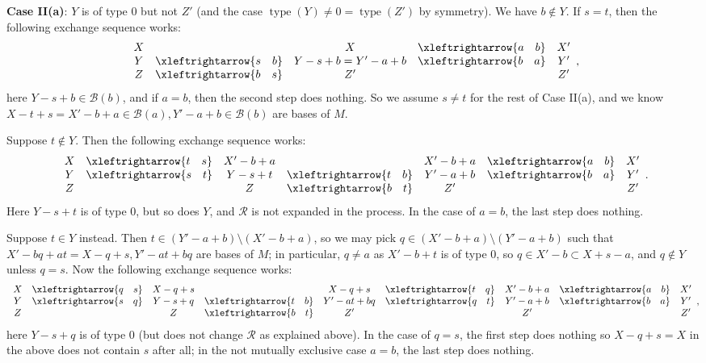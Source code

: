 \documentclass{amsart}
\newcommand{\swap}[2]{\xleftrightarrow{#1 \quad #2}}
\newcommand\Bcal{{\mathcal B}}
\newcommand\Rcal{{\mathcal R}}
\DeclareMathOperator{\type}{type}
\begin{document}
{\bf Case II(a)}: $Y$ is of type 0 but not $Z'$ (and the case $\type(Y)\neq 0=\type(Z')$ by symmetry). We have $b\not\in Y$. If $s=t$, then the following exchange sequence works:
$$
    \begin{array}{c c c c c c c}
        X   &             & X 
            & \swap{a}{b} & X' \\
        Y & \swap{s}{b} & Y-s+b = Y' - a + b
            & \swap{b}{a} & Y' \\
        Z   & \swap{b}{s} & Z'  
            &             & Z'
    \end{array},
$$
here $Y-s+b\in\Bcal(b)$, and if $a=b$, then the second step does nothing. So we assume $s\neq t$ for the rest of Case II(a), and we know $X-t+s=X'-b+a\in\Bcal(a), Y'-a+b\in\Bcal(b)$ are bases of $M$.

Suppose $t\not\in Y$. Then the following exchange sequence works:
$$
    \begin{array}{c c c c c c c}
        X   & \swap{t}{s} & X' - b + a 
            &             & X' - b + a 
            & \swap{a}{b} & X' \\
        Y & \swap{s}{t} & Y - s + t 
            & \swap{t}{b} & Y' - a + b 
            & \swap{b}{a} & Y' \\
        Z   &             & Z 
            & \swap{b}{t} &  Z'  
            &             & Z'
    \end{array}.
$$
Here $Y-s+t$ is of type 0, but so does $Y$, and $\Rcal$ is not expanded in the process. In the case of $a=b$, the last step does nothing.

Suppose $t\in Y$ instead. Then $t\in (Y'-a+b)\setminus (X'-b+a)$, so we may pick $q\in (X'-b+a)\setminus (Y'-a+b)$ such that $X'-bq+at=X-q+s, Y'-at+bq$ are bases of $M$; in particular, $q\neq a$ as $X'-b+t$ is of type 0, so $q\in X'-b\subset X+s-a$, and $q\not\in Y$ unless $q=s$. Now the following exchange sequence works:
$$
    \begin{array}{c c c c c c c c c}
        X   & \swap{q}{s} & X - q + s 
            &                & X - q + s & \swap{t}{q} & X' - b + a 
            & \swap{a}{b}    & X'\\
        Y & \swap{s}{q} & Y - s + q 
            & \swap{t}{b}    & Y' - at + bq & \swap{q}{t} & Y' - a + b 
            & \swap{b}{a}    & Y'\\
        Z   &                & Z
            & \swap{b}{t}    & Z' &                & Z'
                   &                & Z'
    \end{array},
$$
here $Y-s+q$ is of type 0 (but does not change $\Rcal$ as explained above). In the case of $q=s$, the first step does nothing so $X-q+s=X$ in the above does not contain $s$ after all; in the not mutually exclusive case $a=b$, the last step does nothing.\\
\end{document}
